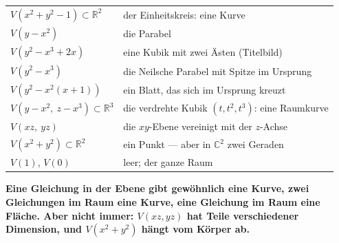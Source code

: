 \begin{merksatz}
\begin{center}
{\small
\renewcommand{\arraystretch}{1.5}
\begin{tabular}{@{}P{3.6cm}P{5.0cm}@{}}
\toprule
$V(x^{2} + y^{2} - 1)\subset\mathbb R^{2}$ & der Einheitskreis: eine Kurve\\
$V(y - x^{2})$ & die Parabel\\
$V(y^{2} - x^{3} + 2x)$ & eine Kubik mit zwei Ästen (Titelbild)\\
$V(y^{2} - x^{3})$ & die Neilsche Parabel mit Spitze im Ursprung\\
$V(y^{2} - x^{2}(x+1))$ & ein Blatt, das sich im Ursprung kreuzt\\
$V(y - x^{2},\ z - x^{3})\subset\mathbb R^{3}$ & die verdrehte Kubik $(t, t^{2}, t^{3})$: eine Raumkurve\\
$V(xz,\ yz)$ & die $xy$-Ebene vereinigt mit der $z$-Achse\\
$V(x^{2} + y^{2})\subset\mathbb R^{2}$ & ein Punkt --- aber in $\mathbb C^{2}$ zwei Geraden\\
$V(1)$, $V(0)$ & leer; der ganze Raum\\
\bottomrule
\end{tabular}}
\end{center}

\begin{center}
\begin{minipage}{0.9\textwidth}
\textbf{Eine Gleichung in der Ebene gibt gewöhnlich eine Kurve, zwei Gleichungen im Raum eine Kurve, eine Gleichung im Raum eine Fläche. Aber nicht immer: $V(xz, yz)$ hat Teile verschiedener Dimension, und $V(x^{2}+y^{2})$ hängt vom Körper ab.}
\end{minipage}
\end{center}
\end{merksatz}

